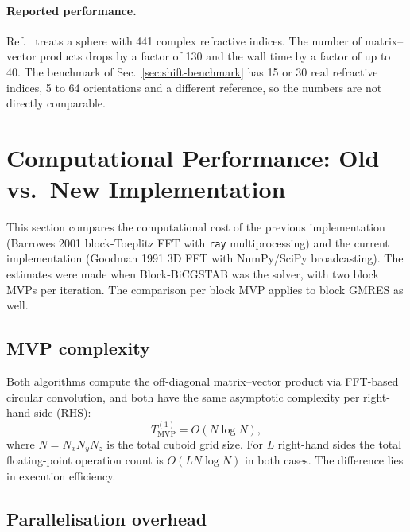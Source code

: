 \documentclass[11pt,a4paper]{article}
\begin{document}
\paragraph{Reported performance.}
Ref.~\cite{Argentin2026} treats a sphere with 441 complex refractive
indices.
The number of matrix--vector products drops by a factor of 130 and the
wall time by a factor of up to 40.
The benchmark of Sec.~\ref{sec:shift-benchmark} has 15 or 30 real
refractive indices, 5 to 64 orientations and a different reference, so
the numbers are not directly comparable.

\section{Computational Performance: Old vs.\ New Implementation}
\label{sec:performance}

This section compares the computational cost of the previous
implementation (Barrowes 2001 block-Toeplitz FFT with \texttt{ray}
multiprocessing) and the current implementation (Goodman 1991 3D FFT
with NumPy/SciPy broadcasting).
The estimates were made when Block-BiCGSTAB was the solver, with two
block MVPs per iteration.
The comparison per block MVP applies to block GMRES as well.

\subsection{MVP complexity}
\label{sec:mvp-complexity}

Both algorithms compute the off-diagonal matrix--vector product via
FFT-based circular convolution, and both have the same asymptotic
complexity per right-hand side (RHS):
\[
  T_{\text{MVP}}^{(1)} = O(N \log N),
\]
where $N = N_x N_y N_z$ is the total cuboid grid size.  For $L$
right-hand sides the total floating-point operation count is
$O(L N \log N)$ in both cases.  The difference lies in execution
efficiency.

\subsection{Parallelisation overhead}
\label{sec:parallel-overhead}
\end{document}
